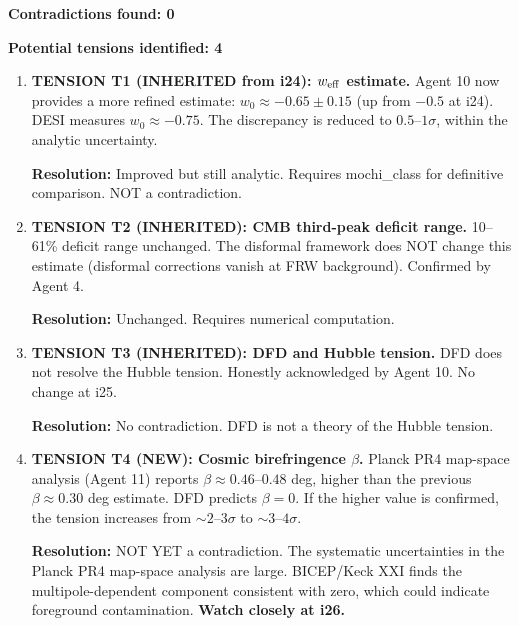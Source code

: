\documentclass[11pt]{article}
\begin{document}
\begin{tcolorbox}[colback=red!5!white, colframe=red!70!black,
  title=\textbf{CROSS-CHECK RESULTS}]

\textbf{Contradictions found: 0}

\textbf{Potential tensions identified: 4}

\begin{enumerate}

\item \textbf{TENSION T1 (INHERITED from i24): $w_{\rm eff}$ estimate.}
  Agent 10 now provides a more refined estimate:
  $w_0 \approx -0.65 \pm 0.15$ (up from $-0.5$ at i24).
  DESI measures $w_0 \approx -0.75$. The discrepancy is reduced
  to $0.5$--$1\sigma$, within the analytic uncertainty.

  \textbf{Resolution:} Improved but still analytic. Requires
  mochi\_class for definitive comparison. NOT a contradiction.

\item \textbf{TENSION T2 (INHERITED): CMB third-peak deficit range.}
  10--61\% deficit range unchanged. The disformal framework does NOT
  change this estimate (disformal corrections vanish at FRW background).
  Confirmed by Agent 4.

  \textbf{Resolution:} Unchanged. Requires numerical computation.

\item \textbf{TENSION T3 (INHERITED): DFD and Hubble tension.}
  DFD does not resolve the Hubble tension. Honestly acknowledged
  by Agent 10. No change at i25.

  \textbf{Resolution:} No contradiction. DFD is not a theory of
  the Hubble tension.

\item \textbf{TENSION T4 (NEW): Cosmic birefringence $\beta$.}
  Planck PR4 map-space analysis (Agent 11) reports
  $\beta \approx 0.46$--$0.48$ deg, higher than the previous
  $\beta \approx 0.30$ deg estimate. DFD predicts $\beta = 0$.
  If the higher value is confirmed, the tension increases from
  $\sim 2$--$3\sigma$ to $\sim 3$--$4\sigma$.

  \textbf{Resolution:} NOT YET a contradiction. The systematic
  uncertainties in the Planck PR4 map-space analysis are large.
  BICEP/Keck XXI finds the multipole-dependent component consistent
  with zero, which could indicate foreground contamination.
  \textbf{Watch closely at i26.}

\end{enumerate}


\end{tcolorbox}
\end{document}
